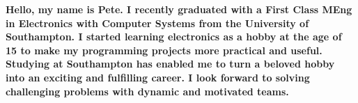 \begin{center}
  \begin{minipage}{170mm}
    \centering
    \bfseries
    Hello, my name is Pete.
    I recently graduated with a First Class MEng in Electronics with Computer Systems from the University of Southampton.
    I started learning electronics as a hobby at the age of 15 to make my programming projects more practical and useful. 
    Studying at Southampton has enabled me to turn a beloved hobby into an exciting and fulfilling career.
    I look forward to solving challenging problems with dynamic and motivated teams.
  \end{minipage}
\end{center}
